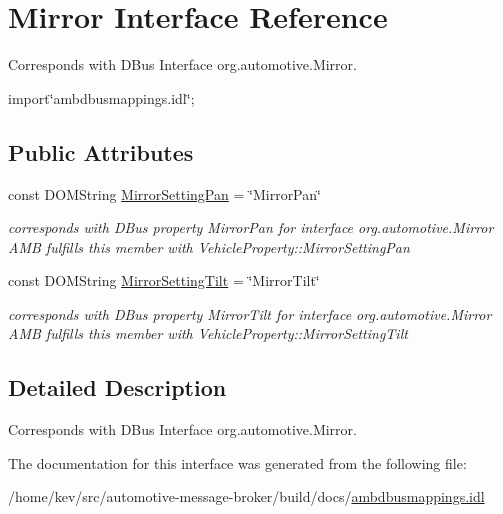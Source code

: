 \hypertarget{interfaceMirror}{\section{Mirror Interface Reference}
\label{interfaceMirror}
}


Corresponds with D\+Bus Interface org.\+automotive.\+Mirror.  




{\ttfamily import\char`\"{}ambdbusmappings.\+idl\char`\"{};}

\subsection*{Public Attributes}
\begin{DoxyCompactItemize}
\item 
\hypertarget{interfaceMirror_a88e4f431f7abd6575f9d431ff0eb5f29}{const D\+O\+M\+String \hyperlink{interfaceMirror_a88e4f431f7abd6575f9d431ff0eb5f29}{Mirror\+Setting\+Pan} = \char`\"{}Mirror\+Pan\char`\"{}}\label{interfaceMirror_a88e4f431f7abd6575f9d431ff0eb5f29}

\begin{DoxyCompactList}\small\item\em corresponds with D\+Bus property Mirror\+Pan for interface org.\+automotive.\+Mirror A\+M\+B fulfills this member with Vehicle\+Property\+::\+Mirror\+Setting\+Pan \end{DoxyCompactList}\item 
\hypertarget{interfaceMirror_a8da36eb05f17b5d1517327968e9bdbe0}{const D\+O\+M\+String \hyperlink{interfaceMirror_a8da36eb05f17b5d1517327968e9bdbe0}{Mirror\+Setting\+Tilt} = \char`\"{}Mirror\+Tilt\char`\"{}}\label{interfaceMirror_a8da36eb05f17b5d1517327968e9bdbe0}

\begin{DoxyCompactList}\small\item\em corresponds with D\+Bus property Mirror\+Tilt for interface org.\+automotive.\+Mirror A\+M\+B fulfills this member with Vehicle\+Property\+::\+Mirror\+Setting\+Tilt \end{DoxyCompactList}\end{DoxyCompactItemize}


\subsection{Detailed Description}
Corresponds with D\+Bus Interface org.\+automotive.\+Mirror. 

The documentation for this interface was generated from the following file\+:\begin{DoxyCompactItemize}
\item 
/home/kev/src/automotive-\/message-\/broker/build/docs/\hyperlink{ambdbusmappings_8idl}{ambdbusmappings.\+idl}\end{DoxyCompactItemize}
